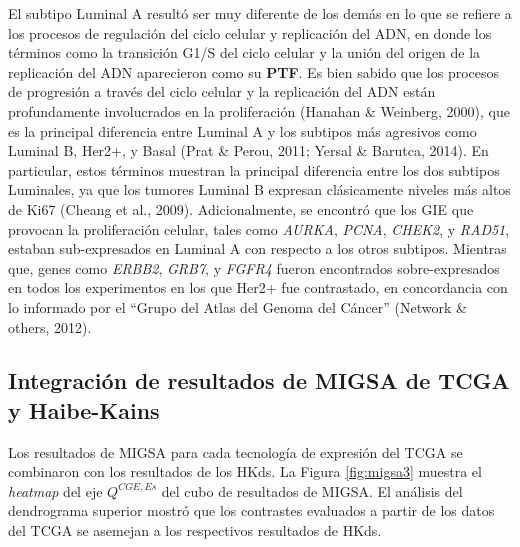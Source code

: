 \documentclass[12pt,twoside]{reedthesis}
\begin{document}
\par

El subtipo Luminal A resultó ser muy diferente de los demás en lo que se refiere a los procesos de regulación del ciclo celular y replicación del ADN, en donde los términos como la transición G1/S del ciclo celular y la unión del origen de la replicación del ADN aparecieron como su \textbf{PTF}. Es bien sabido que los procesos de progresión a través del ciclo celular y la replicación del ADN están profundamente involucrados en la proliferación (Hanahan \& Weinberg, 2000), que es la principal diferencia entre Luminal A y los subtipos más agresivos como Luminal B, Her2+, y Basal (Prat \& Perou, 2011; Yersal \& Barutca, 2014). En particular, estos términos muestran la principal diferencia entre los dos subtipos Luminales, ya que los tumores Luminal B expresan clásicamente niveles más altos de Ki67 (Cheang et al., 2009). Adicionalmente, se encontró que los GIE que provocan la proliferación celular, tales como \emph{AURKA}, \emph{PCNA}, \emph{CHEK2}, y \emph{RAD51}, estaban sub-expresados en Luminal A con respecto a los otros subtipos. Mientras que, genes como \emph{ERBB2}, \emph{GRB7}, y \emph{FGFR4} fueron encontrados sobre-expresados en todos los experimentos en los que Her2+ fue contrastado, en concordancia con lo informado por el ``Grupo del Atlas del Genoma del Cáncer'' (Network \& others, 2012).

\hypertarget{integraciuxf3n-de-resultados-de-migsa-de-tcga-y-haibe-kains}{%
\subsection{Integración de resultados de MIGSA de TCGA y Haibe-Kains}\label{integraciuxf3n-de-resultados-de-migsa-de-tcga-y-haibe-kains}}

\par

Los resultados de MIGSA para cada tecnología de expresión del TCGA se combinaron con los resultados de los HKds. La Figura \ref{fig:migsa3} muestra el \emph{heatmap} del eje \(Q^{CGE,Es}\) del cubo de resultados de MIGSA. El análisis del dendrograma superior mostró que los contrastes evaluados a partir de los datos del TCGA se asemejan a los respectivos resultados de HKds.

\par
\end{document}
